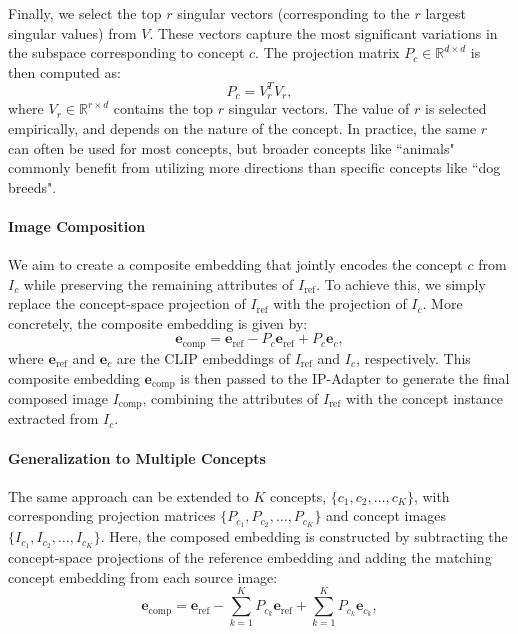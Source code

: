 Finally, we select the top \( r \) singular vectors (corresponding to the \( r \) largest singular values) from \( V \). These vectors capture the most significant variations in the subspace corresponding to concept \( c \). The projection matrix \( P_c \in \mathbb{R}^{d \times d} \) is then computed as:
\begin{equation}
P_c = V_r^T V_r,
\end{equation}
where \( V_r \in \mathbb{R}^{r \times d} \) contains the top \( r \) singular vectors. The value of \( r \) is selected empirically, and depends on the nature of the concept. In practice, the same \( r \) can often be used for most concepts, but broader concepts like ``animals" commonly benefit from utilizing more directions than specific concepts like ``dog breeds".



\paragraph{\textbf{Image Composition}} We aim to create a composite embedding that jointly encodes the concept \( c \) from \( I_c \) while preserving the remaining attributes of \( I_{\text{ref}} \). To achieve this, we simply replace the concept-space projection of \( I_{\text{ref}} \) with the projection of \( I_c \). More concretely, the composite embedding is given by:
\begin{equation}
\mathbf{e}_{\text{comp}} = \mathbf{e}_{\text{ref}} - P_c \mathbf{e}_{\text{ref}} + P_c \mathbf{e}_c,
\end{equation}
where \( \mathbf{e}_{\text{ref}} \) and \( \mathbf{e}_c \) are the CLIP embeddings of \( I_{\text{ref}} \) and \( I_c \), respectively. This composite embedding \( \mathbf{e}_{\text{comp}} \) is then passed to the IP-Adapter to generate the final composed image \( I_{\text{comp}} \), combining the attributes of \( I_{\text{ref}} \) with the concept instance extracted from \( I_c \).

\paragraph{\textbf{Generalization to Multiple Concepts}} The same approach can be extended to \( K \) concepts, \( \{c_1, c_2, \dots, c_K\} \), with corresponding projection matrices \( \{P_{c_1}, P_{c_2}, \dots, P_{c_K}\} \) and concept images \( \{I_{c_1}, I_{c_2}, \dots, I_{c_K}\} \). Here, the composed embedding is constructed by subtracting the concept-space projections of the reference embedding and adding the matching concept embedding from each source image:
\begin{equation}
\mathbf{e}_{\text{comp}} = \mathbf{e}_{\text{ref}} - \sum_{k=1}^K P_{c_k} \mathbf{e}_{\text{ref}} + \sum_{k=1}^K P_{c_k} \mathbf{e}_{c_k},
\end{equation}


